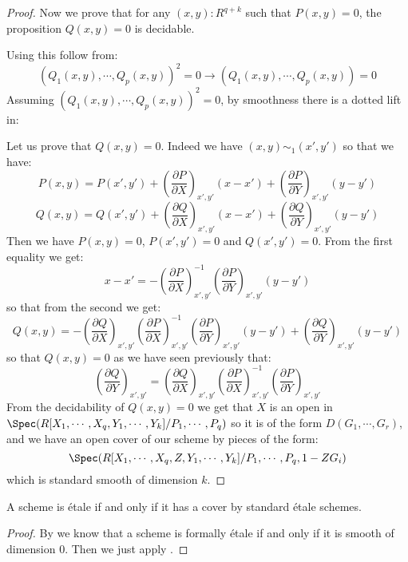 \begin{proof}
Now we prove that for any $(x,y):R^{q+k}$ such that $P(x,y)=0$, the proposition $Q(x,y)=0$ is decidable.

Using  this follow from:
\[(Q_1(x,y),\cdots,Q_p(x,y))^2=0 \to (Q_1(x,y),\cdots,Q_p(x,y))=0\]
Assuming $(Q_1(x,y),\cdots,Q_p(x,y))^2=0$, by smoothness there is a dotted lift in:
\begin{center}
\end{center}
Let us prove that $Q(x,y) = 0$. Indeed we have $(x,y) \sim_1 (x',y')$ so that we have:
\[P(x,y) = P(x',y')+ \left(\frac{\partial P}{\partial X}\right)_{x',y'}(x-x') + \left(\frac{\partial P}{\partial Y}\right)_{x',y'}(y-y') \]
\[Q(x,y) = Q(x',y')+ \left(\frac{\partial Q}{\partial X}\right)_{x',y'}(x-x') + \left(\frac{\partial Q}{\partial Y}\right)_{x',y'}(y-y') \]
Then we have $P(x,y) = 0$, $P(x',y')=0$ and $Q(x',y') = 0$. From the first equality we get:
\[x-x' =  -\left(\frac{\partial P}{\partial X}\right)_{x',y'}^{-1}\left(\frac{\partial P}{\partial Y}\right)_{x',y'}(y-y')\]
so that from the second we get:
\[Q(x,y) = -\left(\frac{\partial Q}{\partial X}\right)_{x',y'}\left(\frac{\partial P}{\partial X}\right)_{x',y'}^{-1}\left(\frac{\partial P}{\partial Y}\right)_{x',y'}(y-y') + \left(\frac{\partial Q}{\partial Y}\right)_{x',y'}(y-y')\]
so that $Q(x,y)=0$ as we have seen previously that:
\[\left(\frac{\partial Q}{\partial Y}\right)_{x',y'} = \left(\frac{\partial Q}{\partial X}\right)_{x',y'}\left(\frac{\partial P}{\partial X}\right)_{x',y'}^{-1} \left(\frac{\partial P}{\partial Y}\right)_{x',y'} \]
From the decidability of $Q(x,y)=0$ we get that $X$ is an open in $\Spec(R[X_1,\cdots,X_q,Y_1,\cdots,Y_k]/P_1,\cdots,P_q)$
so it is of the form $D(G_1,\cdots,G_r)$, and we have an open cover of our scheme by pieces of the form:
\[\Spec(R[X_1,\cdots,X_q,Z,Y_1,\cdots,Y_k]/P_1,\cdots,P_q,1-ZG_i)\]
which is standard smooth of dimension $k$.
\end{proof}

\begin{corollary}
A scheme is étale if and only if it has a cover by standard étale schemes.
\end{corollary}

\begin{proof}
By  we know that a scheme is formally étale if and only if it is smooth of dimension $0$. Then we just apply .
\end{proof}

